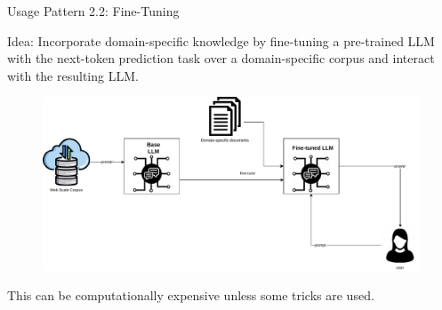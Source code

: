 \documentclass[handout]{beamer}
\begin{document}
\begin{frame}{Usage Pattern 2.2: Fine-Tuning}
\begin{scriptsize}
Idea: Incorporate domain-specific knowledge by fine-tuning a pre-trained LLM with the next-token prediction task over a domain-specific corpus and interact with the resulting LLM. 



    \begin{figure}[h]
        	\includegraphics[scale = 0.35]{pics/llmfinetuning.pdf}
        \end{figure}  

This can be computationally expensive unless some tricks are used.
\end{scriptsize}
\end{frame}
\end{document}
